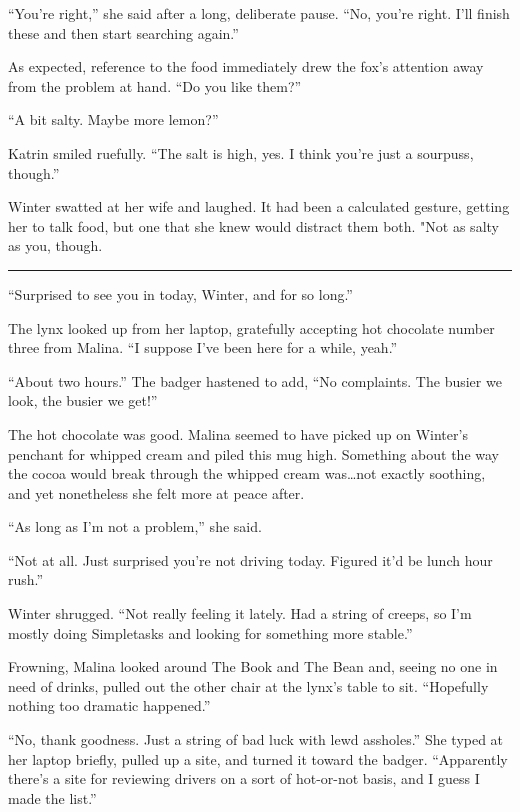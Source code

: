 ``You're right,'' she said after a long, deliberate pause. ``No, you're right. I'll finish these and then start searching again.''

As expected, reference to the food immediately drew the fox's attention away from the problem at hand. ``Do you like them?''

``A bit salty. Maybe more lemon?''

Katrin smiled ruefully. ``The salt is high, yes. I think you're just a sourpuss, though.''

Winter swatted at her wife and laughed. It had been a calculated gesture, getting her to talk food, but one that she knew would distract them both. "Not as salty as you, though.

\begin{center}\rule{0.5\linewidth}{0.5pt}\end{center}

``Surprised to see you in today, Winter, and for so long.''

The lynx looked up from her laptop, gratefully accepting hot chocolate number three from Malina. ``I suppose I've been here for a while, yeah.''

``About two hours.'' The badger hastened to add, ``No complaints. The busier we look, the busier we get!''

The hot chocolate was good. Malina seemed to have picked up on Winter's penchant for whipped cream and piled this mug high. Something about the way the cocoa would break through the whipped cream was\ldots not exactly soothing, and yet nonetheless she felt more at peace after.

``As long as I'm not a problem,'' she said.

``Not at all. Just surprised you're not driving today. Figured it'd be lunch hour rush.''

Winter shrugged. ``Not really feeling it lately. Had a string of creeps, so I'm mostly doing Simpletasks and looking for something more stable.''

Frowning, Malina looked around The Book and The Bean and, seeing no one in need of drinks, pulled out the other chair at the lynx's table to sit. ``Hopefully nothing too dramatic happened.''

``No, thank goodness. Just a string of bad luck with lewd assholes.'' She typed at her laptop briefly, pulled up a site, and turned it toward the badger. ``Apparently there's a site for reviewing drivers on a sort of hot-or-not basis, and I guess I made the list.''

